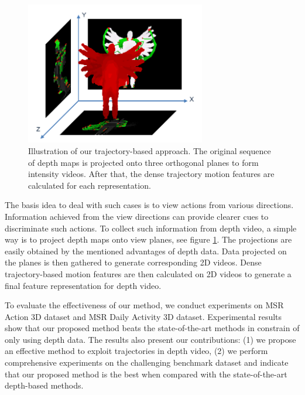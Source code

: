 \documentclass[review]{elsarticle}
\begin{document}
\begin{figure}
	\begin{center}
		\includegraphics[width=0.7\textwidth]{Projections.png}
	\end{center}
	\caption{\label{lbl:Figure_ProposedMethod}Illustration of our trajectory-based approach. The original sequence of depth maps is projected onto three orthogonal planes to form intensity videos. After that, the dense trajectory motion features are calculated for each representation.}
\end{figure}

The basis idea to deal with such cases is to view actions from various directions.
Information achieved from the view directions can provide clearer cues to discriminate such actions.
To collect such information from depth video, a simple way is to project depth maps onto view planes, see figure \ref{lbl:Figure_ProposedMethod}.
The projections are easily obtained by the mentioned advantages of depth data.
Data projected on the planes is then gathered to generate corresponding 2D videos.
Dense trajectory-based motion features are then calculated on 2D videos to generate a final feature representation for depth video.

To evaluate the effectiveness of our method, we conduct experiments on MSR Action 3D dataset and MSR Daily Activity 3D dataset.
Experimental results show that our proposed method beats the state-of-the-art methods in constrain of only using depth data.
The results also present our contributions: (1) we propose an effective method to exploit trajectories in depth video, (2) we perform comprehensive experiments on the challenging benchmark dataset and indicate that our proposed method is the best when compared with the state-of-the-art depth-based methods.
\end{document}
